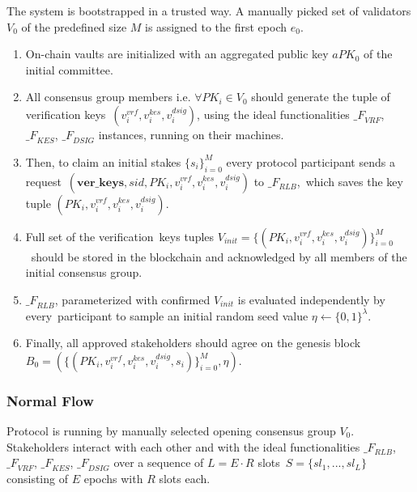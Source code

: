 The system is bootstrapped in a trusted way.
A manually picked set of validators $V_0$ of the predefined size $M$ is assigned to the first epoch $e_0$.
\begin{enumerate}
    \item On-chain vaults are initialized with an aggregated public key $aPK_0$ of the initial committee.

    \item All consensus group members i.e. $\forall PK_i \in V_0$ should generate the tuple of verification keys\
    ${(v_i^{vrf}, v_i^{kes}, v_i^{dsig})}$, using the ideal functionalities ${\mathcal_{F}}_{VRF}$,\
    ${\mathcal_{F}}_{KES}$, ${\mathcal_{F}}_{DSIG}$ instances, running on their machines.

    \item Then, to claim an initial stakes $\{s_i\}_{i=0}^M$ every protocol participant sends a request\
    ${(\textbf{ver\_keys}, sid, PK_i, v_i^{vrf}, v_i^{kes}, v_i^{dsig})}$ to ${\mathcal_{F}}_{RLB}$,\
    which saves the key tuple ${(PK_i, v_i^{vrf}, v_i^{kes}, v_i^{dsig})}$.

    \item Full set of the verification\
    keys tuples ${V_{init} = \{(PK_i, v_i^{vrf}, v_i^{kes}, v_i^{dsig})\}_{i=0}^M}$\
    should be stored in the blockchain and acknowledged by all members of the initial consensus group.

    \item ${\mathcal_{F}}_{RLB}$, parameterized with confirmed $V_{init}$ is evaluated independently by every\
    participant to sample an initial random seed value $\eta \leftarrow \{0, 1\}^\lambda$.

    \item Finally, all approved stakeholders should agree on the genesis block\
    ${B_0=\left(\{(PK_i, v_i^{vrf}, v_i^{kes}, v_i^{dsig}, s_i)\}_{i=0}^M, \eta\right)}$.
\end{enumerate}

\subsubsection{Normal Flow}\label{subsubsec:normal-flow}
Protocol is running by manually selected opening consensus group $V_0$.
Stakeholders interact with each other and with the ideal functionalities ${\mathcal_{F}}_{RLB}$,\
${\mathcal_{F}}_{VRF}$, ${\mathcal_{F}}_{KES}$, ${\mathcal_{F}}_{DSIG}$ over a sequence of $L = E \cdot R$ slots\
${S=\{sl_1,...,sl_L\}}$ consisting of $E$ epochs with $R$ slots each.


